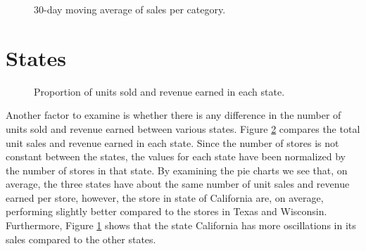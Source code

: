 \begin{figure}[b!]
    \centering
    \captionsetup{width=0.98\textwidth}
    \caption{30-day moving average of sales per category.}
    \label{fig:state_sales}
\end{figure} 

\section{States}
\begin{figure}
    \vspace{-10pt}
    \centering
    \captionsetup{width=0.52\textwidth}
    \caption{Proportion of units sold and revenue earned in each state.}
    \label{fig:sales_rev_states}
    \vspace{-20pt}
\end{figure}
Another factor to examine is whether there is any difference in the number of units sold and revenue earned between various states.
Figure \ref{fig:sales_rev_states} compares the total unit sales and revenue earned in each state. 
Since the number of stores is not constant between the states, the values for each state have been normalized by the number of stores in that state.
By examining the pie charts we see that, on average, the three states have about the same number of unit sales and revenue earned per store, however, the store in state of California are, on average, performing slightly better compared to the stores in Texas and Wisconsin. 
Furthermore, Figure \ref{fig:state_sales} shows that the state California has more oscillations in its sales compared to the other states.


